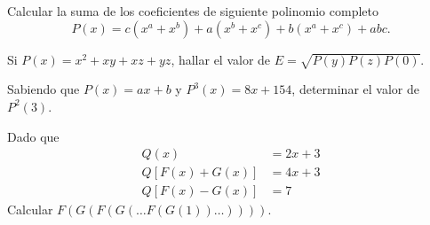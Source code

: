 \begin{multicols}{2}
    \begin{problem}
        Calcular la suma de los coeficientes de siguiente polinomio completo
        \[
            P(x) = c(x^a + x^b) + a(x^b + x^c) + b(x^a + x^c) + abc.
        \]
    \end{problem}

    \begin{problem}
        Si $P(x) = x^2 + xy + xz + yz$, hallar el valor de $E = \sqrt {P(y)P(z)P(0)}$.
    \end{problem}

    \begin{problem}
        Sabiendo que $P(x) = ax + b$ y $P^3(x) = 8x + 154$, determinar el valor de $P^2(3)$.
    \end{problem}

    \begin{problem}
        Dado que
        \begin{align*}
            Q(x) &= 2x + 3 \\
            Q\left[ F(x) + G(x) \right] &= 4x + 3 \\
            Q\left[ F(x) - G(x) \right] &= 7
        \end{align*}
        Calcular $F(G(F(G(\dots F(G(1))\dots))))$.
    \end{problem}
\end{multicols}